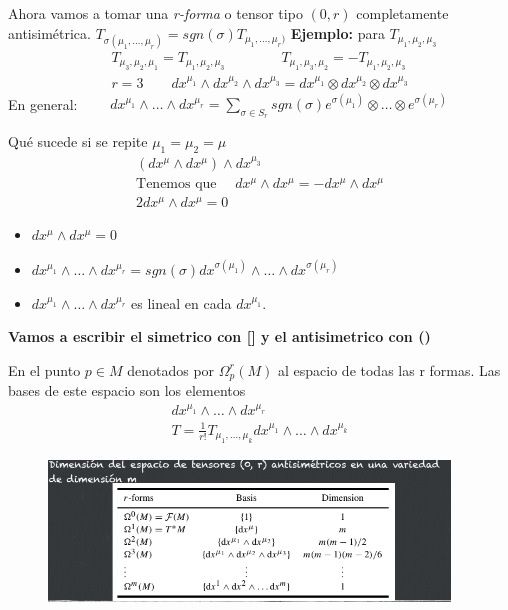 \documentclass{article}
\newcommand{\caja}[3]{%
  \begin{tcolorbox}[colback=#1!5!white,colframe=#1!25!black,title=#2]
    #3
  \end{tcolorbox}%
}
\begin{document}
Ahora vamos a tomar una \textit{r-forma } o tensor tipo $ (0,r ) $ completamente antisimétrica. 
$ T _{\sigma(\mu_1,\dots, \mu_r )} = sgn(\sigma) T _{\mu_1,\dots, \mu_r )}  $
\textbf{Ejemplo: } para $ T _{\mu_1,\mu_2,\mu_3}  $
\begin{gather*}
  T _{\mu_3,\mu_2,\mu_1} = T_{\mu_1,\mu_2,\mu_3}\qquad\qquad T_{\mu_1,\mu_3,\mu_2}  = - T_{\mu_1,\mu_2,\mu_3}\\
  r=3 \qquad dx ^ {\mu_1 }\land dx ^ {\mu_2 } \land dx ^ {\mu_3 } = dx ^ {\mu_1 }\otimes dx ^ {\mu_2 } \otimes dx ^ {\mu_3 }
\end{gather*}
En general: $\qquad dx ^ {\mu_1 }\land \dots \land dx ^ {\mu_r } = \displaystyle\sum_{\sigma \in S_r }^{} sgn(\sigma) e ^ {\sigma(\mu_1 )} \otimes \dots \otimes e ^ {\sigma(\mu_r )}$


Qué sucede si se repite $ \mu_1 = \mu_2 = \mu $
\begin{gather*}
  (dx ^ {\mu} \land dx ^ {\mu })\land dx ^ {\mu_3 }\\
  \text{Tenemos que } \quad dx ^ {\mu} \land dx ^ {\mu } = - dx ^ {\mu } \land dx ^ {\mu } \\
  2dx ^ {\mu}\land dx ^ {\mu } = 0 
\end{gather*}

\caja{black}{propiedades producto $ \land  $}{
  \begin{itemize}
    \item $ dx ^ {\mu}\land dx ^ {\mu } = 0 $
    \item $ dx ^ {\mu_1 } \land \dots\land dx ^ {\mu_r } = sgn(\sigma) dx ^ {\sigma(\mu_1)} \land \dots \land dx ^ {\sigma(\mu_r )} $
    \item $ dx ^ {\mu_1 } \land \dots\land dx ^ {\mu_r } $ es lineal en cada $ dx ^ {\mu_1 } $.
  \end{itemize}
}

\textbf{Vamos a escribir el simetrico con [] y el antisimetrico con ()}

\hfill 

\hfill 

En el punto $ p\in M  $ denotados por $ \Omega _p^r(M) $ al espacio de todas las r formas. Las bases de este espacio son los elementos 
\begin{gather*}
  dx ^ {\mu_1 }\land \dots\land dx ^ {\mu_r }\\
  T = \frac{1}{r! }T _{\mu_1, \dots, \mu_k} dx ^ {\mu_1 }\land \dots\land dx ^ {\mu_k }
\end{gather*}

\begin{figure}[H]
  \begin{center}
    \includegraphics[width=0.95\textwidth]{dim_tensores_antisimetricos.png}
  \end{center}
\end{figure}
\end{document}
